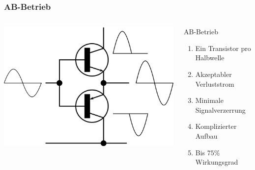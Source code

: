 \begin{frame}
    \frametitle{AB-Betrieb}
        \begin{columns}[c]
        \begin{center}
            \includegraphics[width=1\textwidth,height=.8\textheight,keepaspectratio]{a07/Electronic_Amplifier_Push-pull.png}\\
	    {\tiny \hyperlink{refs}{\cite{wm}}}
    \end{center}
     \large
    \begin{block}{AB-Betrieb}
	    \begin{enumerate} 
			\item Ein Transistor pro Halbwelle
			\item Akzeptabler Verluststrom
			\item Minimale Signalverzerrung
			\item Komplizierter Aufbau
			\item Bis $75\%$ Wirkungsgrad
    	\end{enumerate}
    \end{block}
    \end{columns}
\end{frame}

